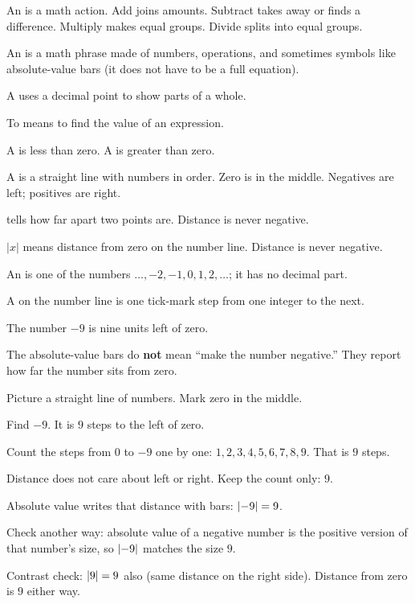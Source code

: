 \begin{words}
  \item An is a math action. Add joins amounts. Subtract takes away or finds a
        difference. Multiply makes equal groups. Divide splits into equal groups.
  \item An is a math phrase made of numbers, operations, and sometimes symbols
        like absolute-value bars (it does not have to be a full equation).
  \item A uses a decimal point to show parts of a whole.
  \item To means to find the value of an expression.
  \item A is less than zero. A is greater than zero.
  \item A is a straight line with numbers in order. Zero is in the middle.
        Negatives are left; positives are right.
  \item {}tells how far apart two points are. Distance is never negative.
  \item {}$|x|$ means distance from zero on the number line. Distance is
        never negative.
  \item An is one of the numbers $\ldots, -2, -1, 0, 1, 2, \ldots$; it has no decimal part.
  \item A on the number line is one tick-mark step from one integer to the next.
  \item The number $-9$ is nine units left of zero.
  \item The absolute-value bars do \textbf{not} mean ``make the number negative.'' They report how
        far the number sits from zero.
\end{words}

\begin{steps}
  \item Picture a straight line of numbers. Mark zero in the middle.
  \item Find $-9$. It is $9$ steps to the left of zero.
  \item Count the steps from $0$ to $-9$ one by one: $1, 2, 3, 4, 5, 6, 7, 8, 9$. That is $9$ steps.
  \item Distance does not care about left or right. Keep the count only: $9$.
  \item Absolute value writes that distance with bars: $\left\lvert -9 \right\rvert = 9$.
  \item Check another way: absolute value of a negative number is the positive version of that
        number's size, so $\left\lvert -9 \right\rvert$ matches the size $9$.
  \item Contrast check: $\left\lvert 9 \right\rvert = 9$ also (same distance on the right side). Distance from zero is
        $9$ either way.
\end{steps}

